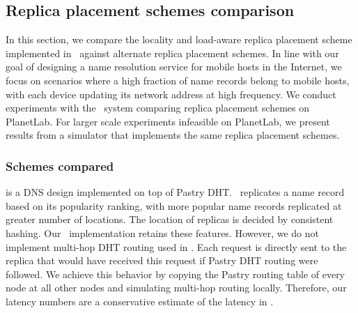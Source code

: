 


\subsection{Replica placement schemes comparison}


In this section, we compare the locality and load-aware replica placement scheme implemented in \auspice\ against alternate replica placement schemes. In line with our goal of designing a name resolution service for mobile hosts in the Internet, we focus on scenarios where a high fraction of name records belong to mobile hosts, with each device updating its network address at high frequency. We conduct experiments with the \auspice\ system comparing replica placement schemes on PlanetLab. For larger scale experiments infeasible on PlanetLab, we present results from a simulator that implements the same replica placement schemes.




\subsubsection{Schemes compared}



%
\textbf{\codons} is a DNS design implemented on top of Pastry DHT. \codons\ replicates a name record based on its popularity ranking, with more popular name records replicated at greater number of  locations.  The location of replicas is decided by consistent hashing. Our \codons\ implementation retains these features. However, we do not implement multi-hop DHT routing used in \codons. Each request is directly sent to the replica  that would have received this request if Pastry DHT routing were followed.
We achieve this behavior by copying the Pastry routing table of every node at all other nodes and simulating multi-hop routing locally.
Therefore, our latency numbers are a conservative estimate of the latency in \codons. 

